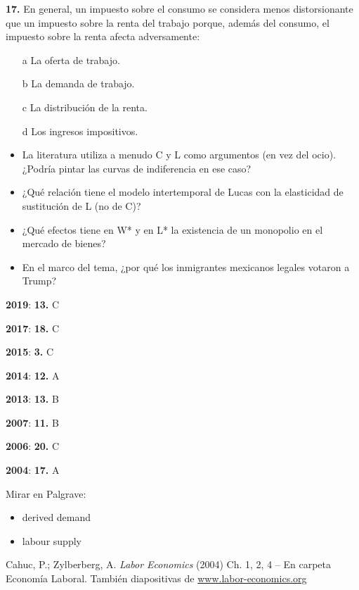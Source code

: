 \documentclass{nuevotema}
\begin{document}

\textbf{17.} En general, un impuesto sobre el consumo se considera menos distorsionante que un impuesto sobre la renta del trabajo porque, además del consumo, el impuesto sobre la renta afecta adversamente:
\begin{enumerate}
	\item[a] La oferta de trabajo.
	\item[b] La demanda de trabajo.
	\item[c] La distribución de la renta.
	\item[d] Los ingresos impositivos.
\end{enumerate}


\begin{itemize}
    \item La literatura utiliza a menudo C y L como argumentos (en vez del ocio). ¿Podría pintar las curvas de indiferencia en ese caso?
    \item ¿Qué relación tiene el modelo intertemporal de Lucas con la elasticidad de sustitución de L (no de C)?
    \item ¿Qué efectos tiene en W* y en L* la existencia de un monopolio en el mercado de bienes?
    \item En el marco del tema, ¿por qué los inmigrantes mexicanos legales votaron a Trump?
\end{itemize}


\notas

\textbf{2019}: \textbf{13.} C

\textbf{2017}: \textbf{18.} C

\textbf{2015}: \textbf{3.} C

\textbf{2014}: \textbf{12.} A

\textbf{2013}: \textbf{13.} B

\textbf{2007}: \textbf{11.} B

\textbf{2006}: \textbf{20.} C 

\textbf{2004}: \textbf{17.} A

\bibliografia

Mirar en Palgrave:
\begin{itemize}
	\item derived demand
	\item labour supply
\end{itemize}

Cahuc, P.; Zylberberg, A. \textit{Labor Economics} (2004) Ch. 1, 2, 4 -- En carpeta Economía Laboral. También diapositivas de \url{www.labor-economics.org}
\end{document}

